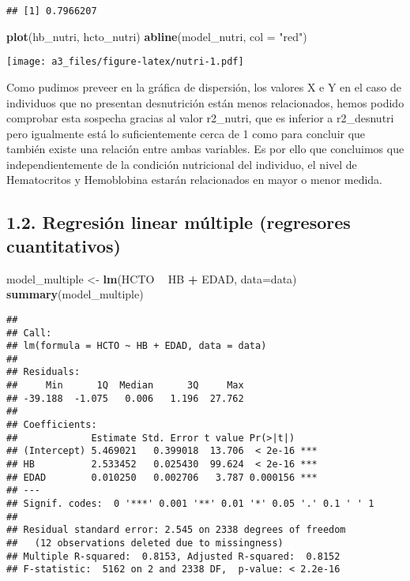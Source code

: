 \documentclass[]{article}
\newenvironment{Shaded}{\begin{snugshade}}{\end{snugshade}}
\newcommand{\DataTypeTok}[1]{\textcolor[rgb]{0.13,0.29,0.53}{#1}}
\newcommand{\KeywordTok}[1]{\textcolor[rgb]{0.13,0.29,0.53}{\textbf{#1}}}
\newcommand{\NormalTok}[1]{#1}
\newcommand{\OperatorTok}[1]{\textcolor[rgb]{0.81,0.36,0.00}{\textbf{#1}}}
\newcommand{\StringTok}[1]{\textcolor[rgb]{0.31,0.60,0.02}{#1}}
\begin{document}
\begin{verbatim}
## [1] 0.7966207
\end{verbatim}

\begin{Shaded}
\begin{Highlighting}[]
\KeywordTok{plot}\NormalTok{(hb_nutri, hcto_nutri)}
\KeywordTok{abline}\NormalTok{(model_nutri, }\DataTypeTok{col =} \StringTok{"red"}\NormalTok{)}
\end{Highlighting}
\end{Shaded}

\texttt{[image: a3\_files/figure-latex/nutri-1.pdf]}

Como pudimos preveer en la gráfica de dispersión, los valores X e Y en
el caso de individuos que no presentan desnutrición están menos
relacionados, hemos podido comprobar esta sospecha gracias al valor
r2\_nutri, que es inferior a r2\_desnutri pero igualmente está lo
suficientemente cerca de 1 como para concluir que también existe una
relación entre ambas variables. Es por ello que concluimos que
independientemente de la condición nutricional del individuo, el nivel
de Hematocritos y Hemoblobina estarán relacionados en mayor o menor
medida.

\hypertarget{regresiuxf3n-linear-muxfaltiple-regresores-cuantitativos}{%
\subsection{1.2. Regresión linear múltiple (regresores
cuantitativos)}\label{regresiuxf3n-linear-muxfaltiple-regresores-cuantitativos}}

\begin{Shaded}
\begin{Highlighting}[]
\NormalTok{model_multiple <-}\StringTok{ }\KeywordTok{lm}\NormalTok{(HCTO }\OperatorTok{~}\StringTok{ }\NormalTok{HB }\OperatorTok{+}\StringTok{ }\NormalTok{EDAD, }\DataTypeTok{data=}\NormalTok{data)}
\KeywordTok{summary}\NormalTok{(model_multiple)}
\end{Highlighting}
\end{Shaded}

\begin{verbatim}
## 
## Call:
## lm(formula = HCTO ~ HB + EDAD, data = data)
## 
## Residuals:
##     Min      1Q  Median      3Q     Max 
## -39.188  -1.075   0.006   1.196  27.762 
## 
## Coefficients:
##             Estimate Std. Error t value Pr(>|t|)    
## (Intercept) 5.469021   0.399018  13.706  < 2e-16 ***
## HB          2.533452   0.025430  99.624  < 2e-16 ***
## EDAD        0.010250   0.002706   3.787 0.000156 ***
## ---
## Signif. codes:  0 '***' 0.001 '**' 0.01 '*' 0.05 '.' 0.1 ' ' 1
## 
## Residual standard error: 2.545 on 2338 degrees of freedom
##   (12 observations deleted due to missingness)
## Multiple R-squared:  0.8153, Adjusted R-squared:  0.8152 
## F-statistic:  5162 on 2 and 2338 DF,  p-value: < 2.2e-16
\end{verbatim}
\end{document}
